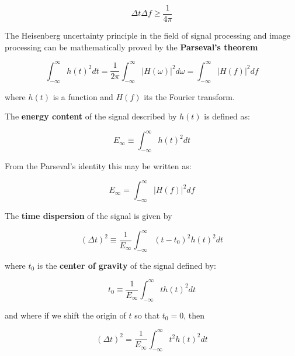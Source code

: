 \begin{equation}\label{eq:uncertainty_principle_freq}
	\Delta t\Delta f \geq \frac{1}{4\pi}
\end{equation}

The Heisenberg uncertainty principle in the field of signal processing and image processing can be mathematically proved by the \textbf{Parseval's theorem}

\begin{equation}\label{eq:parseval_theorem}
	\int_{-\infty}^{\infty} h(t)^2 dt =  \frac{1}{2 \pi} \int_{-\infty}^{\infty} |H(\omega)|^2 d\omega =  \int_{-\infty}^{\infty} |H(f)|^2 df
\end{equation}

where $h(t)$ is a function and $H(f)$ its the Fourier transform. 

The \textbf{energy content} of the signal described by $h(t)$ is defined as:

\begin{equation}\label{eq:energy_content_time}
    E_{\infty} \equiv \int_{-\infty}^{\infty}  h(t)^2 dt
\end{equation}


From the Parseval's identity this may be written as:

\begin{equation}\label{eq:energy_content_frequency}
    E_{\infty} =  \int_{-\infty}^{\infty} |H(f)|^2 df
\end{equation}

The \textbf{time dispersion} of the signal is given by

\begin{equation}\label{eq:time_dispersion_no_centered}
    (\Delta t)^2 \equiv \frac{1}{E_{\infty}} \int_{-\infty}^{\infty} (t-t_{0})^2 h(t)^2 dt
\end{equation}

where $t_0$ is the \textbf{center of gravity} of the signal defined by:

\begin{equation}\label{eq:center_of_gravity}
    t_0 \equiv \frac{1}{E_{\infty}} \int_{-\infty}^{\infty} t h(t)^2 dt
\end{equation}

and where if we shift the origin of $t$ so that $t_{0}=0$, then

\begin{equation}\label{eq:time_dispersion}
    (\Delta t)^2 = \frac{1}{E_{\infty}} \int_{-\infty}^{\infty} t^2 h(t)^2 dt
\end{equation}

